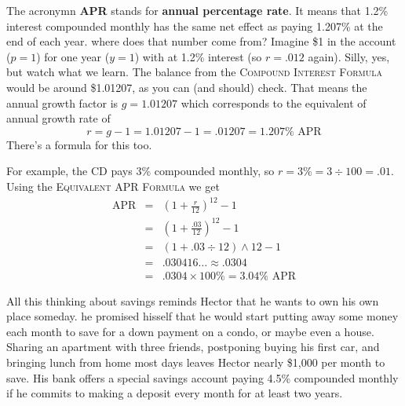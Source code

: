 The acronymn \textbf{APR} stands for \textbf{annual percentage rate}.  It means that 1.2\% interest compounded monthly has the same net effect as paying 1.207\% at the end of each year.  where does that number come from?  Imagine \$1 in the account  ($p=1$) for one year ($y=1$) with at 1.2\% interest (so $r=.012$ again).  Silly, yes, but watch what we learn.  
The balance from the \textsc{Compound Interest Formula} would be around \$1.01207, as you can (and should) check.
That means the annual growth factor is $g=1.01207$ which corresponds to the equivalent of annual growth rate of $$r=g-1=1.01207-1 = .01207 = 1.207\% \text{ APR}$$  There's a formula for this too.

 \bigskip
\bigskip

For example, the CD pays 3\% compounded monthly, so $r=3\% = 3 \div 100 = .01$.  Using the \textsc{Equivalent APR Formula} we get
\begin{eqnarray*}
\text{APR}  &= & \left(1+\frac{r}{12}\right)^{12}-1\\
& = &   \left(1+\frac{.03}{12}\right)^{12}-1\\
& =  & ( 1 + .03 \div 12 ) \wedge 12 -1  \\
& =  & .030416\ldots  \approx .0304 \\
& = & .0304 \times 100\% = 3.04\% \text{ APR}
\end{eqnarray*}

All this thinking about savings reminds Hector that he wants to own his own place someday.  he promised hisself that he would start putting away some money each month to save for a down payment on a condo, or maybe even a house.  Sharing an apartment with three friends, postponing buying his first car, and bringing lunch from home most days leaves Hector nearly \$1,000 per month to save.  His bank offers a special savings account paying 4.5\% compounded monthly if he commits to making a deposit every month for at least two years.

